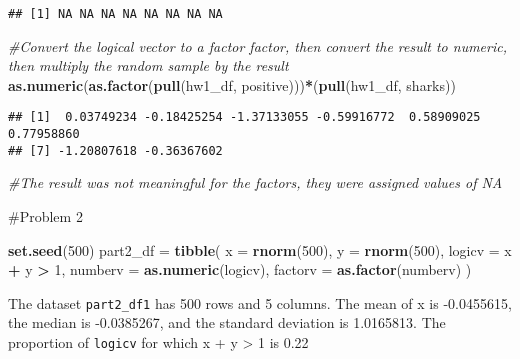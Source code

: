 \documentclass[]{article}
\newenvironment{Shaded}{\begin{snugshade}}{\end{snugshade}}
\newcommand{\CommentTok}[1]{\textcolor[rgb]{0.56,0.35,0.01}{\textit{#1}}}
\newcommand{\DataTypeTok}[1]{\textcolor[rgb]{0.13,0.29,0.53}{#1}}
\newcommand{\DecValTok}[1]{\textcolor[rgb]{0.00,0.00,0.81}{#1}}
\newcommand{\KeywordTok}[1]{\textcolor[rgb]{0.13,0.29,0.53}{\textbf{#1}}}
\newcommand{\NormalTok}[1]{#1}
\newcommand{\OperatorTok}[1]{\textcolor[rgb]{0.81,0.36,0.00}{\textbf{#1}}}
\newcommand{\StringTok}[1]{\textcolor[rgb]{0.31,0.60,0.02}{#1}}
\begin{document}
\begin{verbatim}
## [1] NA NA NA NA NA NA NA NA
\end{verbatim}

\begin{Shaded}
\begin{Highlighting}[]
\CommentTok{#Convert the logical vector to a factor factor, then convert the result to numeric, then multiply the random sample by the result}
\KeywordTok{as.numeric}\NormalTok{(}\KeywordTok{as.factor}\NormalTok{(}\KeywordTok{pull}\NormalTok{(hw1_df, positive)))}\OperatorTok{*}\NormalTok{(}\KeywordTok{pull}\NormalTok{(hw1_df, sharks))}
\end{Highlighting}
\end{Shaded}

\begin{verbatim}
## [1]  0.03749234 -0.18425254 -1.37133055 -0.59916772  0.58909025  0.77958860
## [7] -1.20807618 -0.36367602
\end{verbatim}

\begin{Shaded}
\begin{Highlighting}[]
\CommentTok{#The result was not meaningful for the factors, they were assigned values of NA}
\end{Highlighting}
\end{Shaded}

\#Problem 2

\begin{Shaded}
\begin{Highlighting}[]
\KeywordTok{set.seed}\NormalTok{(}\DecValTok{500}\NormalTok{)}
\NormalTok{part2_df =}\StringTok{ }\KeywordTok{tibble}\NormalTok{(}
  \DataTypeTok{x =} \KeywordTok{rnorm}\NormalTok{(}\DecValTok{500}\NormalTok{),}
  \DataTypeTok{y =} \KeywordTok{rnorm}\NormalTok{(}\DecValTok{500}\NormalTok{),}
  \DataTypeTok{logicv =}\NormalTok{ x }\OperatorTok{+}\StringTok{ }\NormalTok{y }\OperatorTok{>}\StringTok{ }\DecValTok{1}\NormalTok{,}
  \DataTypeTok{numberv =} \KeywordTok{as.numeric}\NormalTok{(logicv),}
  \DataTypeTok{factorv =} \KeywordTok{as.factor}\NormalTok{(numberv)}
\NormalTok{)}
\end{Highlighting}
\end{Shaded}

The dataset \texttt{part2\_df1} has 500 rows and 5 columns. The mean of
x is -0.0455615, the median is -0.0385267, and the standard deviation is
1.0165813. The proportion of \texttt{logicv} for which x + y
\textgreater{} 1 is 0.22
\end{document}
